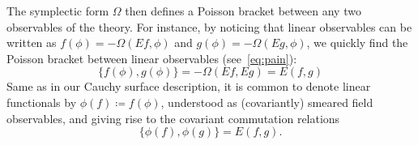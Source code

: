 \documentclass[letterpaper,12pt,titlepage,oneside,final]{book}
\newcommand{\M}{\mathcal{M}}
\renewcommand{\S}{\mathcal{S}}
\newcommand{\mf}{\mathsf}%
\newcommand{\trr}[1]{\textcolor{red}{#1}}
\begin{document}
The symplectic form $\Omega$ then defines a Poisson bracket between any two observables of the theory. For instance, by noticing that linear observables can be written as $f(\phi) = -\Omega(Ef,\phi)$ and $g(\phi) = -\Omega(Eg,\phi)$, we quickly find the Poisson bracket between linear observables (see~\eqref{eq:pain}):
\begin{equation}
    \{f(\phi), g(\phi)\} = - \Omega(Ef,Eg) = E(f,g)
\end{equation}
Same as in our Cauchy surface description, it is common to denote linear functionals by $\phi(f) \coloneqq f(\phi)$, understood as (covariantly) smeared field observables, and giving rise to the covariant commutation relations
\begin{equation}
    \{\phi(f),\phi(g)\} = E(f,g).
\end{equation}
\end{document}
